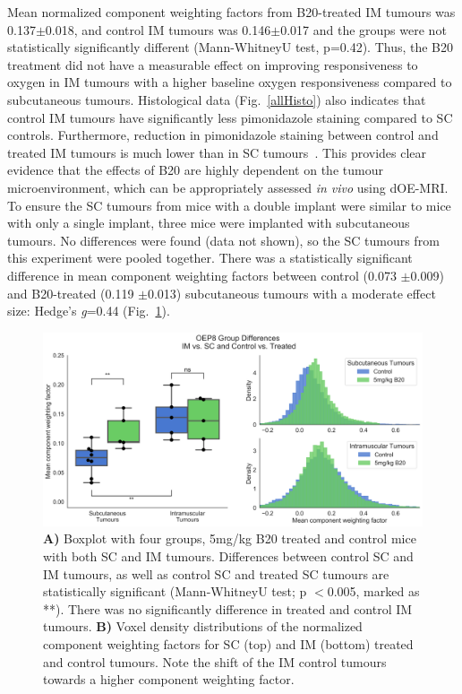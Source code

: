 Mean normalized component weighting factors from B20-treated IM tumours was 0.137$\pm$0.018, and control IM tumours was 0.146$\pm$0.017 and the groups were not statistically significantly different (Mann-WhitneyU test, p=0.42). 
Thus, the B20 treatment did not have a measurable effect on improving responsiveness to oxygen in IM tumours with a higher baseline oxygen responsiveness compared to subcutaneous tumours.
Histological data (Fig.~\ref{allHisto}) also indicates that control IM tumours have significantly less pimonidazole staining compared to SC controls.
Furthermore, reduction in pimonidazole staining between control and treated IM tumours is much lower than in SC tumours~. 
This provides clear evidence that the effects of B20 are highly dependent on the tumour microenvironment, which can be appropriately assessed \emph{in vivo} using \ac{dOE-MRI}.
To ensure the SC tumours from mice with a double implant were similar to mice with only a single implant, three mice were implanted with subcutaneous tumours.
No differences were found (data not shown), so the SC tumours from this experiment were pooled together.
There was a statistically significant difference in mean component weighting factors between control (0.073 $\pm$0.009) and B20-treated (0.119 $\pm$0.013) subcutaneous tumours with a moderate effect size: Hedge's \emph{g}=0.44 (Fig.~\ref{OEP8boxplot}).

\begin{figure}[htbp]
   \centering
   \includegraphics[width=\textwidth]{oemri_thesis3/oemri_thesis3-images/4_oep8_IMSC_b20_sanitized_dOEMRI.png} %
   \caption{\textbf{A)} Boxplot with four groups, 5mg/kg B20 treated and control mice with both SC and IM tumours.
   Differences between control SC and IM tumours, as well as control SC and treated SC tumours are statistically significant (Mann-WhitneyU test; p $<$0.005, marked as **).
   There was no significantly difference in treated and control IM tumours.
   \textbf{B)} Voxel density distributions of the normalized component weighting factors for SC (top) and IM (bottom) treated and control tumours.
   Note the shift of the IM control tumours towards a higher component weighting factor.}
   \label{OEP8boxplot}
\end{figure}


